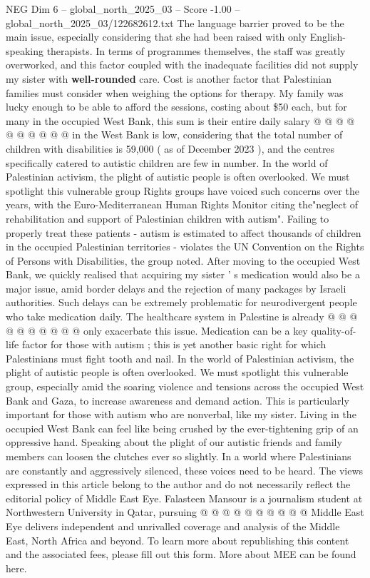 \begin{textsample}{NEG Dim 6 – global\_north\_2025\_03 – Score -1.00 – global\_north\_2025\_03/122682612.txt}
The language barrier proved to be the main issue, especially considering that she had been raised with only English-speaking therapists.
In terms of programmes themselves, the staff was greatly overworked, and this factor coupled with the inadequate facilities did not supply my sister with \textbf{well-rounded} care.
Cost is another factor that Palestinian families must consider when weighing the options for therapy.
My family was lucky enough to be able to afford the sessions, costing about \$50 each, but for many in the occupied West Bank, this sum is their entire daily salary @ @ @ @ @ @ @ @ @ @ in the West Bank is low, considering that the total number of children with disabilities is 59,000 ( as of December 2023 ), and the centres specifically catered to autistic children are few in number.
In the world of Palestinian activism, the plight of autistic people is often overlooked.
We must spotlight this vulnerable group Rights groups have voiced such concerns over the years, with the Euro-Mediterranean Human Rights Monitor citing the"neglect of rehabilitation and support of Palestinian children with autism".
Failing to properly treat these patients - autism is estimated to affect thousands of children in the occupied Palestinian territories - violates the UN Convention on the Rights of Persons with Disabilities, the group noted.
After moving to the occupied West Bank, we quickly realised that acquiring my sister ' s medication would also be a major issue, amid border delays and the rejection of many packages by Israeli authorities.
Such delays can be extremely problematic for neurodivergent people who take medication daily.
The healthcare system in Palestine is already @ @ @ @ @ @ @ @ @ @ only exacerbate this issue.
Medication can be a key quality-of-life factor for those with autism ; this is yet another basic right for which Palestinians must fight tooth and nail.
In the world of Palestinian activism, the plight of autistic people is often overlooked.
We must spotlight this vulnerable group, especially amid the soaring violence and tensions across the occupied West Bank and Gaza, to increase awareness and demand action.
This is particularly important for those with autism who are nonverbal, like my sister.
Living in the occupied West Bank can feel like being crushed by the ever-tightening grip of an oppressive hand.
Speaking about the plight of our autistic friends and family members can loosen the clutches ever so slightly.
In a world where Palestinians are constantly and aggressively silenced, these voices need to be heard.
The views expressed in this article belong to the author and do not necessarily reflect the editorial policy of Middle East Eye.
Falasteen Mansour is a journalism student at Northwestern University in Qatar, pursuing @ @ @ @ @ @ @ @ @ @ Middle East Eye delivers independent and unrivalled coverage and analysis of the Middle East, North Africa and beyond.
To learn more about republishing this content and the associated fees, please fill out this form.
More about MEE can be found here.

\end{textsample}
